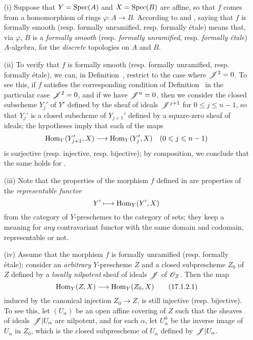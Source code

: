 \begin{remark}[17.1.2]
\label{IV.17.1.2}
\medskip\noindent
\begin{enumerate}
  \item[(i)] Suppose that $Y=\operatorname{Spec}(A)$ and $X=\operatorname{Spec}(B)$ are affine, so that $f$ comes from a homomorphism of rings $\varphi:A\to B$. 
    According to  and , saying that $f$ is formally smooth (resp. formally unramified, resp. formally \'etale) means that, via $\varphi$, $B$ is a \emph{formally smooth} (resp. \emph{formally unramified}, resp. \emph{formally \'etale}) $A$-algebra, for the \emph{discrete} topologies on $A$ and $B$.
  \item[(ii)] To verify that $f$ is formally smooth (resp. formally unramified, resp. formally \'etale), we can, in Definition~, restrict to the case where $\mathscr{J}^2=0$.
  To see this, if $f$ satisfies the corresponding condition of Definition~ in the particular case $\mathscr{J}^2=0$, and if we have $\mathscr{J}^n=0$, then we consider the closed subscheme $Y_j'$ of $Y'$ defined by the sheaf of ideals $\mathscr{J}^{j+1}$ for $0\leq j\leq n-1$, so that $Y_j'$ is a closed subscheme of $Y_{j+1}'$ defined by a square-zero sheaf of ideals;
the hypotheses imply that each of the maps
\[
  \Hom_Y(Y_{j+1}',X)\to\Hom_Y(Y_j',X)\quad(0\leq j\leq n-1) 
\]
is surjective (resp. injective, resp. bijective);
by composition, we conclude that the same holds for .
\item[(iii)] Note that the properties of the morphism $f$ defined in  are properties of the \emph{representable functor} 
\[
  Y'\mapsto\Hom_Y(Y',X) 
\]
from the category of $Y$-preschemes to the category of sets;
they keep a meaning for \emph{any} contravariant functor with the same domain and codomain, representable or not.
\item[(iv)] Assume that the morphism $f$ is formally unramified (resp. formally \'etale);
consider an \emph{arbitrary} $Y$-prescheme $Z$ and a closed subprescheme $Z_0$ of $Z$ defined by a \emph{locally nilpotent} sheaf of ideals $\mathscr{J}$ of $\mathscr{O}_Z$. 
Then the map
\[
\label{IV.17.1.2.1}  
  \Hom_Y(Z,X)\to\Hom_Y(Z_0,X)
  \tag{17.1.2.1}
\]
induced by the canonical injection $Z_0\to Z$, is still injective (resp. bijective).
To see this, let $(U_\alpha)$ be an open affine covering of $Z$ such that the sheaves of ideals $\mathscr{J}|U_\alpha$ are nilpotent, and for each $\alpha$, let $U_\alpha^0$ be the inverse image of $U_\alpha$ in $Z_0$, which is the closed subprescheme of $U_\alpha$ defined by $\mathscr{J}|U_\alpha$.

\end{enumerate}
\end{remark}
